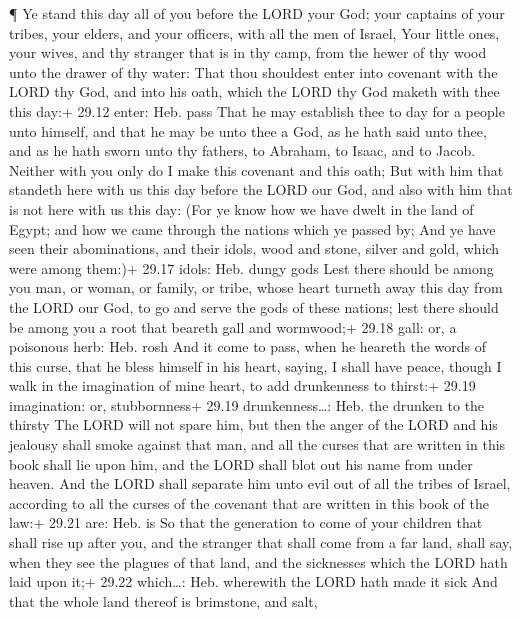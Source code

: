  ¶ Ye stand this day all of you before the LORD your God;
your captains of your tribes, your elders, and your officers, with all
the men of Israel,  Your little ones, your wives, and thy
stranger that is in thy camp, from the hewer of thy wood unto the drawer
of thy water:  That thou shouldest enter into covenant with
the LORD thy God, and into his oath, which the LORD thy God maketh with
thee this day:+ 29.12 enter: Heb. pass  That he may
establish thee to day for a people unto himself, and that he may be unto
thee a God, as he hath said unto thee, and as he hath sworn unto thy
fathers, to Abraham, to Isaac, and to Jacob.  Neither with
you only do I make this covenant and this oath;  But with
him that standeth here with us this day before the LORD our God, and
also with him that is not here with us this day:  (For ye
know how we have dwelt in the land of Egypt; and how we came through the
nations which ye passed by;  And ye have seen their
abominations, and their idols, wood and stone, silver and gold, which
were among them:)+ 29.17 idols: Heb. dungy gods  Lest there
should be among you man, or woman, or family, or tribe, whose heart
turneth away this day from the LORD our God, to go and serve the gods of
these nations; lest there should be among you a root that beareth gall
and wormwood;+ 29.18 gall: or, a poisonous herb: Heb. rosh 
And it come to pass, when he heareth the words of this curse, that he
bless himself in his heart, saying, I shall have peace, though I walk in
the imagination of mine heart, to add drunkenness to thirst:+ 29.19
imagination: or, stubbornness+ 29.19 drunkenness\ldots: Heb. the drunken
to the thirsty  The LORD will not spare him, but then the
anger of the LORD and his jealousy shall smoke against that man, and all
the curses that are written in this book shall lie upon him, and the
LORD shall blot out his name from under heaven.  And the
LORD shall separate him unto evil out of all the tribes of Israel,
according to all the curses of the covenant that are written in this
book of the law:+ 29.21 are: Heb. is  So that the
generation to come of your children that shall rise up after you, and
the stranger that shall come from a far land, shall say, when they see
the plagues of that land, and the sicknesses which the LORD hath laid
upon it;+ 29.22 which\ldots: Heb. wherewith the LORD hath made it sick
 And that the whole land thereof is brimstone, and salt,

